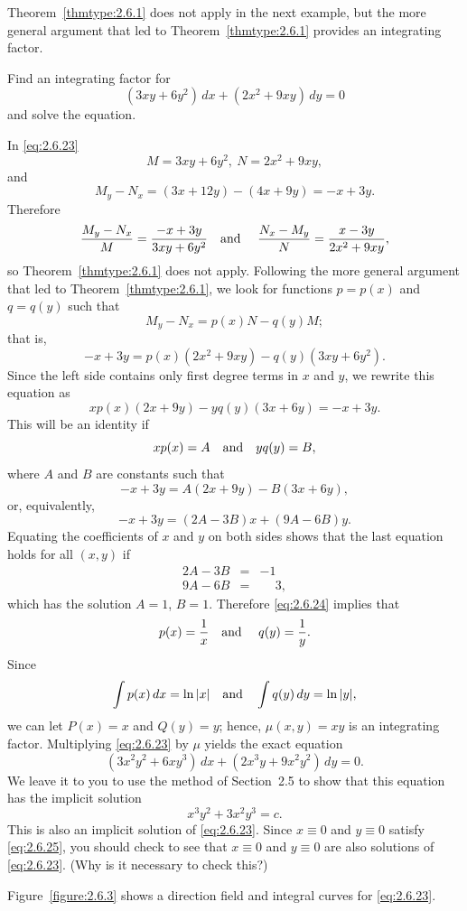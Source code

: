 Theorem~\ref{thmtype:2.6.1} does not apply in the next example, but the more general argument that
led to Theorem~\ref{thmtype:2.6.1} provides an integrating factor.

\begin{example}
  \label{example:2.6.3} \rm Find an integrating factor for
  \begin{equation}
    \label{eq:2.6.23}(3xy+6y^{2})\,dx+(2x^{2}+9xy)\,dy=0
  \end{equation}
  and solve the equation.
\end{example}

\begin{examplesolution}
\solution In \eqref{eq:2.6.23}
\[
  M=3xy+6y^{2},\ N=2x^{2}+9xy,
\]
and
\[
  M_{y}-N_{x}=(3x+12y)-(4x+9y)=-x+3y.
\]
Therefore
\[
  \frac{M_{y}-N_{x}}{M}=\frac{-x+3y}{3xy+6y^{2}}\mbox{\quad and \quad}{\frac{N_{x}-M_{y}}{N}}=\frac{x-3y}{2x^{2}+9xy},
\]
so Theorem~\ref{thmtype:2.6.1} does not apply. Following the more general argument that led to
Theorem~\ref{thmtype:2.6.1}, we look for functions $p=p(x)$ and $q=q(y)$ such that
\[
  M_{y}-N_{x}=p(x)N-q(y)M;
\]
that is,
\[
  -x+3y=p(x)(2x^{2}+9xy)-q(y)(3xy+6y^{2}).
\]
Since the left side contains only first degree terms in $x$ and $y$, we rewrite this equation as
\[
  xp(x)(2x+9y)-yq(y)(3x+6y)=-x+3y.
\]
This will be an identity if
\begin{equation}
  \label{eq:2.6.24}xp(x)=A\mbox{\quad and\quad}yq(y)=B,
\end{equation}
where $A$ and $B$ are constants such that
\[
  -x+3y=A(2x+9y)-B(3x+6y),
\]
or, equivalently,
\[
  -x+3y=(2A-3B)x+(9A-6B)y.
\]
Equating the coefficients of $x$ and $y$ on both sides shows that the last equation holds for all
$(x,y)$ if
\begin{eqnarray*}
  2A-3B & = & -1 \\
  9A-6B & = & \phantom{-}3,
\end{eqnarray*}
which has the solution $A=1$, $B=1$. Therefore \eqref{eq:2.6.24} implies that
\[
  p(x)=\frac{1}{x}\mbox{\quad and \quad}q(y)=\frac{1}{y}.
\]
Since
\[
  \int p(x)\,dx=\ln|x|\mbox{\quad and\quad}\int q(y)\,dy=\ln|y|,
\]
we can let $P(x)=x$ and $Q(y)=y$; hence, $\mu(x,y)=xy$ is an integrating factor. Multiplying
\eqref{eq:2.6.23} by $\mu$ yields the exact equation
\[
  (3x^{2}y^{2}+6xy^{3})\,dx+(2x^{3}y+9x^{2}y^{2})\,dy=0.
\]
We leave it to you to use the method of Section~2.5 to show that this equation has the implicit
solution
\begin{equation}
  \label{eq:2.6.25}x^{3}y^{2}+3x^{2}y^{3}=c.
\end{equation}
This is also an implicit solution of \eqref{eq:2.6.23}. Since $x\equiv0$ and $y\equiv0$ satisfy
\eqref{eq:2.6.25}, you should check to see that $x\equiv0$ and $y\equiv0$ are also solutions of
\eqref{eq:2.6.23}. (Why is it necessary to check this?)

Figure~\ref{figure:2.6.3} shows a direction field and integral curves for \eqref{eq:2.6.23}.
\end{examplesolution}

